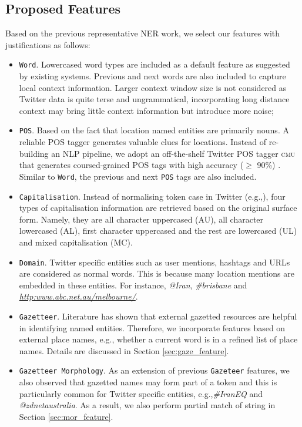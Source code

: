\documentclass[11pt]{article}
\newcommand{\eg}{e.g.,\xspace}
\newcommand{\myex}[1]{\textit{#1}}
\newcommand{\cmu}{\textsc{cmu}\xspace}
\newcommand{\feature}[1]{\texttt{#1}\xspace}
\newcommand{\myurl}[1]{{\footnotesize\url{#1}}}
\newcommand{\secref}[2][]{Section#1 \ref{#2}}
\begin{document}
\subsection{Proposed Features}
\label{sec:basic_feature}

Based on the previous representative NER work, we select our features with justifications as follows:
\begin{itemize}
    \item \feature{Word}. Lowercased word types are included as a default feature as suggested by existing systems. Previous and next words are also included to capture local context information. Larger context window size is not considered as Twitter data is quite terse and ungrammatical, incorporating long distance context may bring little context information but introduce more noise;
    \item \feature{POS}. Based on the fact that location named entities are primarily nouns. A reliable POS tagger generates valuable clues for locations. Instead of re-building an NLP pipeline, we adopt an off-the-shelf Twitter POS tagger \cmu that generates coursed-grained POS tags with high accuracy ($\ge$ 90\%) \cite{naacl13owop}. Similar to \feature{Word}, the previous and next \feature{POS} tags are also included.
    \item \feature{Capitalisation}. Instead of normalising token case in Twitter (\eg \cite{emnlp11ritt}), four types of capitalisation information are retrieved based on the original surface form. Namely, they are all character uppercased (AU), all character lowercased (AL), first character uppercased and the rest are lowercased (UL) and mixed capitalisation (MC). 
    \item \feature{Domain}. Twitter specific entities such as user mentions, hashtags and URLs are considered as normal words. This is because many location mentions are embedded in these entities. For instance, \myex{@Iran}, \myex{\#brisbane} and \myex{\myurl{http:www.abc.net.au/melbourne/}}.
    \item \feature{Gazetteer}. Literature has shown that external gazetted resources are helpful in identifying named entities. Therefore, we incorporate features based on external place names, \eg whether a current word is in a refined list of place names. Details are discussed in \secref{sec:gaze_feature}.
    \item \feature{Gazetteer Morphology}. As an extension of previous \feature{Gazeteer} features, we also observed that gazetted names may form part of a token and this is particularly common for Twitter specific entities, \eg \myex{\#IranEQ} and \myex{@zdnetaustralia}. As a result, we also perform partial match of string in \secref{sec:mor_feature}.
\end{itemize}
\end{document}
